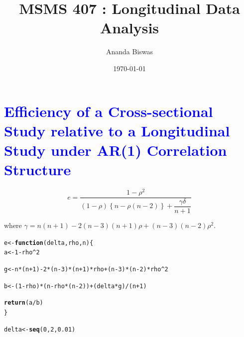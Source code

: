 \documentclass[11pt, a4paper]{article}\usepackage[]{graphicx}\usepackage[]{xcolor}
\title{MSMS 407 : Longitudinal Data Analysis}
\author{{\fontsize{22}{20} \benyorithafont Ananda Biswas}}
\date{\today}
\makeatletter
\newcommand{\hlnum}[1]{\textcolor[rgb]{0.686,0.059,0.569}{#1}}%
\newcommand{\hlopt}[1]{\textcolor[rgb]{0,0,0}{#1}}%
\newcommand{\hldef}[1]{\textcolor[rgb]{0.345,0.345,0.345}{#1}}%
\newcommand{\hlkwa}[1]{\textcolor[rgb]{0.161,0.373,0.58}{\textbf{#1}}}%
\newcommand{\hlkwb}[1]{\textcolor[rgb]{0.69,0.353,0.396}{#1}}%
\newcommand{\hlkwc}[1]{\textcolor[rgb]{0.333,0.667,0.333}{#1}}%
\newcommand{\hlkwd}[1]{\textcolor[rgb]{0.737,0.353,0.396}{\textbf{#1}}}%
\newenvironment{kframe}{%
 \def\at@end@of@kframe{}%
 \ifinner\ifhmode%
  \def\at@end@of@kframe{\end{minipage}}%
  \begin{minipage}{\columnwidth}%
 \fi\fi%
 \def\FrameCommand##1{\hskip\@totalleftmargin \hskip-\fboxsep
 \colorbox{shadecolor}{##1}\hskip-\fboxsep
     \hskip-\linewidth \hskip-\@totalleftmargin \hskip\columnwidth}%
 \MakeFramed {\advance\hsize-\width
   \@totalleftmargin\z@ \linewidth\hsize
   \@setminipage}}%
 {\par\unskip\endMakeFramed%
 \at@end@of@kframe}
\newenvironment{knitrout}{}{} %
\makeatother
\begin{document}
\maketitle

\section*{\faArrowAltCircleRight[regular] \textcolor{blue}{Efficiency of a Cross-sectional Study relative to a Longitudinal Study under AR(1) Correlation Structure}}

$$e = \dfrac{1-\rho^2}{(1-\rho)\left\{n - \rho(n - 2)\right\} + \dfrac{\gamma \delta}{n+1}}$$

where $\gamma = n(n+1) - 2(n-3)(n+1) \rho + (n-3)(n-2) \rho^2$.




\begin{knitrout}
\color{fgcolor}\begin{kframe}
\begin{alltt}
\hldef{e} \hlkwb{<-} \hlkwa{function}\hldef{(}\hlkwc{delta}\hldef{,} \hlkwc{rho}\hldef{,} \hlkwc{n}\hldef{)\{}
  \hldef{a} \hlkwb{<-} \hlnum{1} \hlopt{-} \hldef{rho}\hlopt{^}\hlnum{2}

  \hldef{g} \hlkwb{<-} \hldef{n} \hlopt{*} \hldef{(n} \hlopt{+} \hlnum{1}\hldef{)} \hlopt{-} \hlnum{2} \hlopt{*} \hldef{(n} \hlopt{-} \hlnum{3}\hldef{)} \hlopt{*} \hldef{(n} \hlopt{+} \hlnum{1}\hldef{)} \hlopt{*} \hldef{rho} \hlopt{+} \hldef{(n} \hlopt{-} \hlnum{3}\hldef{)} \hlopt{*} \hldef{(n} \hlopt{-} \hlnum{2}\hldef{)} \hlopt{*} \hldef{rho}\hlopt{^}\hlnum{2}

  \hldef{b} \hlkwb{<-} \hldef{(}\hlnum{1} \hlopt{-} \hldef{rho)} \hlopt{*} \hldef{(n} \hlopt{-} \hldef{rho} \hlopt{*} \hldef{(n} \hlopt{-} \hlnum{2}\hldef{))} \hlopt{+} \hldef{(delta} \hlopt{*} \hldef{g)} \hlopt{/} \hldef{(n} \hlopt{+} \hlnum{1}\hldef{)}

  \hlkwd{return}\hldef{(a} \hlopt{/} \hldef{b)}
\hldef{\}}
\end{alltt}
\end{kframe}
\end{knitrout}



\begin{knitrout}
\color{fgcolor}\begin{kframe}
\begin{alltt}
\hldef{delta} \hlkwb{<-} \hlkwd{seq}\hldef{(}\hlnum{0}\hldef{,} \hlnum{2}\hldef{,} \hlnum{0.01}\hldef{)}
\end{alltt}
\end{kframe}
\end{knitrout}
\end{document}
